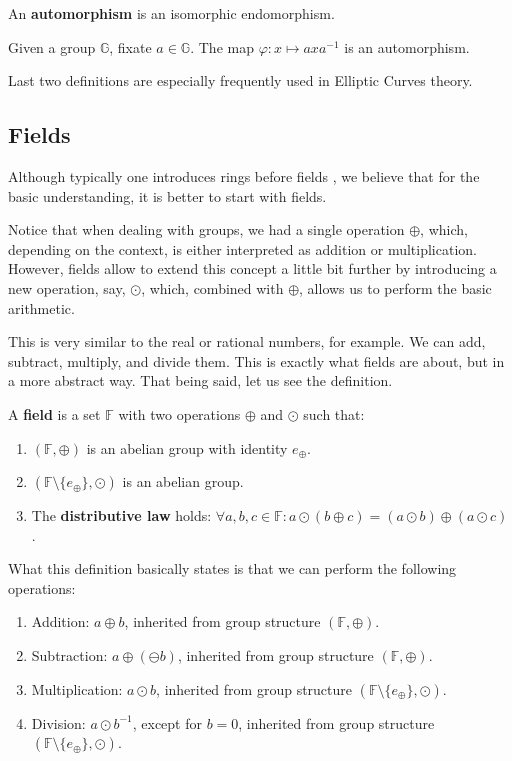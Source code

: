 \documentclass[../lecture-notes-148x210.tex]{subfiles}
\begin{document}
\begin{definition}
    An \textbf{automorphism} is an isomorphic endomorphism.
\end{definition}

\begin{example}
    Given a group $\mathbb{G}$, fixate $a \in \mathbb{G}$. The map $\varphi: x \mapsto axa^{-1}$ is an automorphism.
\end{example}

Last two definitions are especially frequently used in Elliptic Curves theory.

\subsection{Fields}

Although typically one introduces rings before fields \cite[section 16]{Judson_2012}, we believe that for the 
basic understanding, it is better to start with fields. 

Notice that when dealing with groups, we had a single operation $\oplus$, which, depending on the context, is either 
interpreted as addition or multiplication. However, fields allow to extend this concept a little bit further by 
introducing a new operation, say, $\odot$, which, combined with $\oplus$, allows us to perform the basic arithmetic.

This is very similar to the real or rational numbers, for example. We can add, subtract, multiply, and divide them. 
This is exactly what fields are about, but in a more abstract way. That being said, let us see the definition.

\begin{definition}
    A \textbf{field} is a set $\mathbb{F}$ with two operations $\oplus$ and $\odot$ such that:
    \begin{enumerate}
        \item $(\mathbb{F}, \oplus)$ is an abelian group with identity $e_{\oplus}$.
        \item $(\mathbb{F} \setminus \{e_{\oplus}\}, \odot)$ is an abelian group.
        \item The \textbf{distributive law} holds: $\forall a,b,c \in \mathbb{F}: a \odot (b \oplus c) = (a \odot b) \oplus (a \odot c)$.
    \end{enumerate}
\end{definition}

What this definition basically states is that we can perform the following operations:
\begin{enumerate}
    \item Addition: $a \oplus b$, inherited from group structure $(\mathbb{F}, \oplus)$.
    \item Subtraction: $a \oplus (\ominus b)$, inherited from group structure $(\mathbb{F}, \oplus)$.
    \item Multiplication: $a \odot b$, inherited from group structure $(\mathbb{F} \setminus \{e_{\oplus}\}, \odot)$.
    \item Division: $a \odot b^{-1}$, except for $b=0$, inherited from group structure $(\mathbb{F} \setminus \{e_{\oplus}\}, \odot)$.
\end{enumerate}
\end{document}
